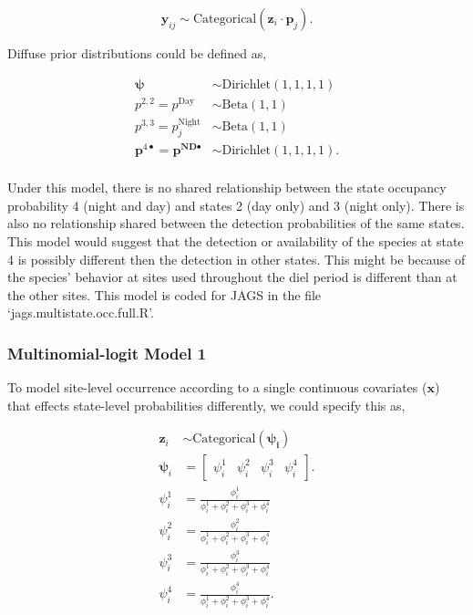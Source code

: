 \documentclass[12pt]{article}
\begin{document}
\begin{equation}
\textbf{y}_{ij} \sim \text{Categorical}(\textbf{z}_{i} \cdot \boldsymbol{p}_{j}).
\end{equation}

Diffuse prior distributions could be defined as,
\begin{center}
\begin{align*}
\boldsymbol{\psi} &\sim \text{Dirichlet}(1,1,1,1)\\
p^{2,2}= p^{\text{Day}} &\sim \text{Beta}(1,1)\\
p^{3,3} = p_{j}^{\text{Night}}  &\sim \text{Beta}(1,1)\\
\boldsymbol{p}^{4 \bullet} = \boldsymbol{p^{\text{ND}\bullet}} &\sim \text{Dirichlet}(1,1,1,1).\\
\end{align*}
\end{center}

Under this model, there is no shared relationship between the state occupancy probability 4 (night and day) and states 2 (day only) and 3 (night only). There is also no relationship shared between the detection probabilities of the same states. This model would suggest that the detection or availability of the species at state 4 is possibly different then the detection in other states. This might be because of the species' behavior at sites used throughout the diel period is different than at the other sites. This model is coded for JAGS in the file `jags.multistate.occ.full.R'.

\subsubsection{Multinomial-logit Model 1}
To model site-level occurrence according to a single continuous covariates ($\mathbf{x}$) that effects state-level probabilities differently, we could specify this as,
\begin{center}
\begin{align*}
\textbf{z}_{i} &\sim \text{Categorical}(\boldsymbol{\psi_{i}})\\
\boldsymbol{\psi}_{i} &= \begin{bmatrix} \psi^1_{i} & \psi^2_{i} & \psi^3_{i} & \psi^4_{i} \end{bmatrix}.\\
\psi^1_{i} &=\frac{\phi^1_{i}}{\phi^1_{i}+ \phi^2_{i}+\phi^3_{i}+\phi^4_{i}}\\
\psi^2_{i} &=\frac{\phi^2_{i}}{\phi^1_{i}+ \phi^2_{i}+\phi^3_{i}+\phi^4_{i}}\\
\psi^3_{i} &=\frac{\phi^3_{i}}{\phi^1_{i}+ \phi^2_{i}+\phi^3_{i}+\phi^4_{i}}\\
\psi^4_{i} &=\frac{\phi^4_{i}}{\phi^1_{i}+ \phi^2_{i}+\phi^3_{i}+\phi^4_{i}}.\\
\end{align*}
\end{center}
\end{document}
